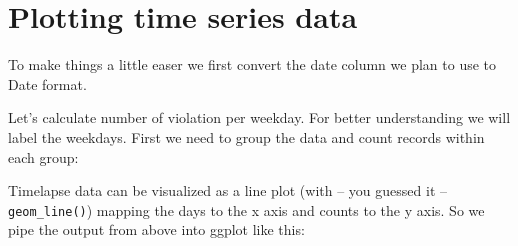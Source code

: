 \documentclass[]{book}
\newenvironment{Shaded}{\begin{snugshade}}{\end{snugshade}}
\newcommand{\KeywordTok}[1]{\textcolor[rgb]{0.13,0.29,0.53}{\textbf{#1}}}
\newcommand{\DataTypeTok}[1]{\textcolor[rgb]{0.13,0.29,0.53}{#1}}
\newcommand{\StringTok}[1]{\textcolor[rgb]{0.31,0.60,0.02}{#1}}
\newcommand{\OtherTok}[1]{\textcolor[rgb]{0.56,0.35,0.01}{#1}}
\newcommand{\OperatorTok}[1]{\textcolor[rgb]{0.81,0.36,0.00}{\textbf{#1}}}
\newcommand{\NormalTok}[1]{#1}
\theoremstyle{definition}
\theoremstyle{definition}
\theoremstyle{definition}
\theoremstyle{remark}
\begin{document}
\section{Plotting time series data}\label{plotting-time-series-data}

To make things a little easer we first convert the date column we plan
to use to Date format.

\begin{Shaded}
\end{Shaded}

Let's calculate number of violation per weekday. For better
understanding we will label the weekdays. First we need to group the
data and count records within each group:

\begin{Shaded}
\end{Shaded}

Timelapse data can be visualized as a line plot (with -- you guessed it
-- \texttt{geom\_line()}) mapping the days to the x axis and counts to
the y axis. So we pipe the output from above into ggplot like this:

\begin{Shaded}
\end{Shaded}
\end{document}
